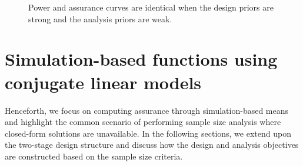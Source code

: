 \begin{figure}%
    \centering
    \qquad
    \caption{Power and assurance curves are identical when the design priors are strong and the analysis priors are weak.}%
    \label{fig:pwr_assur_curve}%
\end{figure}




\section{Simulation-based functions using conjugate linear models}\label{sec:simform}

Henceforth, we focus on computing 
assurance through simulation-based means 
and highlight the common scenario of performing sample 
size analysis where closed-form solutions 
are unavailable. 
In the following sections, we extend upon the 
two-stage design structure 
and discuss how the design and analysis objectives are 
constructed based on the sample size criteria. 

